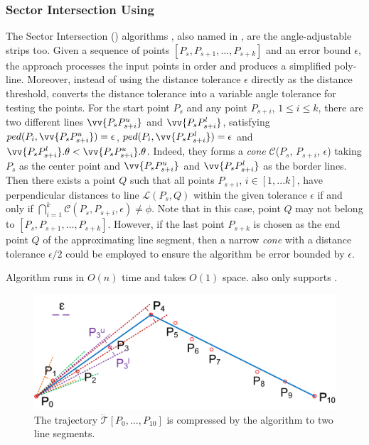 \subsubsection {Sector Intersection Using \ped}

The Sector Intersection (\sia) algorithms \cite{Williams:Longest,Sklansky:Cone,Dunham:Cone}, also named \sleeve in \cite{Zhao:Sleeve}, are {the angle-adjustable strips too}.
Given a sequence of points $[P_{s}, P_{s+1}, \ldots, P_{s+k}]$ and an error bound $\epsilon$, the \cia approach processes the input points in order and produces a simplified poly-line.  Moreover, instead of using the distance tolerance $\epsilon$ directly as the distance threshold, \cia converts the distance tolerance into a variable angle tolerance for testing the points.
%
For the start point $P_s$ and any point $P_{s+i}$, $1\le i\le k$, there are two different lines $\vv{P_sP^u_{s+i}}$ and $\vv{P_sP^l_{s+i}}$, satisfying $ped(P_i, \vv{P_sP^u_{s+i}}) = \epsilon$, $ped(P_i, \vv{P_sP^l_{s+i}}) = \epsilon$ and $\vv{P_sP^l_{s+i}}.\theta < \vv{P_sP^u_{s+i}}.\theta$. Indeed, they forms a \emph{cone} $\mathcal{C}$($P_s$, $P_{s+i}$, $\epsilon$) taking $P_s$ as the center point and $\vv{P_sP^u_{s+i}}$ and $\vv{P_sP^l_{s+i}}$ as the border lines.
Then there exists a point $Q$ such that all points $P_{s+i}$, $i \in [1, ... k]$, have perpendicular distances to
line $\mathcal{L}(P_s,Q)$ within the given \ped tolerance $\epsilon$ if and only if $\bigcap_{i=1}^{k}\mathcal{C}(P_s, P_{s+i}, \epsilon) \ne \phi$.
Note that in this case, point $Q$ may not belong to $[P_{s}, P_{s+1}, \ldots, P_{s+k}]$.
However, if the last point $P_{s+k}$ is chosen as the end point $Q$ of the approximating line segment, then a narrow \emph{cone} with a distance tolerance $\epsilon/2$ could be employed to ensure the algorithm be \ped error bounded by $\epsilon$\cite{Zhao:Sleeve}.

Algorithm \cia runs in $O(n)$ time and takes $O(1)$ space.
\cia also only supports \ped.


\begin{figure}[tb!]
\centering
\includegraphics[scale=0.66]{figures/Fig-sleeve.png}
\vspace{-1ex}
\caption{\small The trajectory $\dddot{\mathcal{T}}[P_0, \ldots, P_{10}]$ is compressed by the \conei algorithm to two line segments.}
\vspace{-2ex}
\label{fig:sleeve}
\end{figure}


